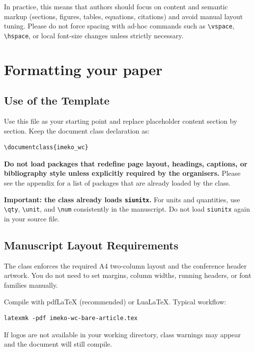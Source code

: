 \documentclass{imeko_wc}
\begin{document}
In practice, this means that authors should focus on content and semantic markup (sections, figures, tables, equations, citations) and avoid manual layout tuning. Please do not force spacing with ad-hoc commands such as \verb|\vspace|, \verb|\hspace|, or local font-size changes unless strictly necessary.




\section{Formatting your paper}

\subsection{Use of the Template}

Use this file as your starting point and replace placeholder content section by section. Keep the document class declaration as:
\begin{verbatim}
\documentclass{imeko_wc}
\end{verbatim}

\textbf{Do not load packages that redefine page layout, headings, captions, or bibliography style unless explicitly required by the organisers.} Please see the appendix for a list of packages that are already loaded by the class.

\textbf{Important: the class already loads \texttt{siunitx}.} For units and quantities, use \verb|\qty|, \verb|\unit|, and \verb|\num| consistently in the manuscript. Do not load \verb|siunitx| again in your source file.

\subsection{Manuscript Layout Requirements}
The class enforces the required A4 two-column layout and the conference header artwork. You do not need to set margins, column widths, running headers, or font families manually.

Compile with pdf\LaTeX{} (recommended) or Lua\LaTeX. Typical workflow:
\begin{verbatim}
latexmk -pdf imeko-wc-bare-article.tex
\end{verbatim}
If logos are not available in your working directory, class warnings may appear and the document will still compile.
\end{document}
